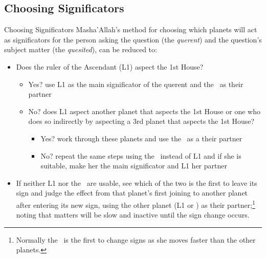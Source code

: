 \subsection{Choosing Significators}
\begin{frame}[t]{Choosing Significators}
Masha'Allah's method for choosing which planets will act as significators for the person asking the question (the \textsl{querent}) and the question's subject matter (the \textsl{quesited}), can be reduced to:
\begin{itemize}
\item Does the ruler of the Ascendant (L1) aspect the 1st House?
	\begin{itemize}
		\item Yes? use L1 as the main significator of the querent and the \Moon\ as their partner
		\item No? does L1 aspect another planet that aspects the 1st House or one who does so indirectly by aspecting a 3rd planet that aspects the 1st House?
			\begin{itemize}
				\item Yes? work through these planets and use the \Moon\ as a their partner
				\item No? repeat the same steps using the \Moon\ instead of L1 and if she is suitable, make her the main significator and L1 her partner
			\end{itemize}
	\end{itemize}
\item If neither L1 nor the \Moon\ are usable, see which of the two is the first to leave its sign and judge the effect from that planet's first joining to another planet after entering its new sign, using the other planet (L1 or \Moon) as their partner;\footnote{Normally the \Moon\ is the first to change signs as she moves faster than the other planets.} noting that matters will be slow and inactive until the sign change occurs.
\end{itemize}

\end{frame}
